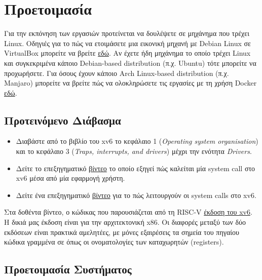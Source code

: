 \documentclass[18pt]{extarticle}
\begin{document}
\section{Προετοιμασία}

Για την εκπόνηση των εργασιών προτείνεται να δουλέψετε σε μηχάνημα που τρέχει Linux.
Οδηγιές για το πώς να ετοιμάσετε μια εικονική μηχανή με Debian Linux σε VirtualBox μπορείτε να βρείτε \href{}{εδώ}. %
Αν έχετε ήδη μηχάνημα το οποίο τρέχει Linux και συγκεκριμένα κάποιο
Debian-based distribution (π.χ. Ubuntu) τότε μπορείτε να προχωρήσετε.
Για όσους έχουν κάποιο Arch Linux-based distribution (π.χ. Manjaro) μπορείτε να βρείτε πώς να ολοκληρώσετε τις εργασίες
με τη χρήση Docker \href{}{εδώ}. %

\subsection{Προτεινόμενο Διάβασμα}

\begin{itemize}

    \item Διαβάστε από το βιβλίο του xv6 \cite{xv6Book} το κεφάλαιο 1 (\textit{Operating
          system organisation}) και το κεφάλαιο 3 (\textit{Traps, interrupts, and
          drivers}) μέχρι την ενότητα \textit{Drivers}.
    \item Δείτε το επεξηγηματικό \href{https://www.youtube.com/watch?v=RdxHGyeoyqI}{βίντεο} το οποίο εξηγεί πώς καλείται μία system call στο xv6 μέσα από μία εφαρμογή χρήστη.
    \item Δείτε ένα επεξηγηματικό \href{https://www.youtube.com/watch?v=w7Q66ItKrn8}{βίντεο} για το πώς λειτουργούν οι system calls στο xv6.

\end{itemize}

\begin{info}[Σημείωση]
    Στα δοθέντα βίντεο, ο κώδικας που παρουσιάζεται από τη RISC-V \href{https://github.com/mit-pdos/xv6-riscv}{έκδοση του xv6}.
    Η δικιά μας έκδοση είναι για την αρχιτεκτονική x86. Οι διαφορές μεταξύ των δύο εκδόσεων είναι πρακτικά αμελητέες,
    με μόνες εξαιρέσεις τα σημεία του πηγαίου κώδικα γραμμένα σε  όπως οι ονοματολογίες των καταχωρητών (registers).
\end{info}

\subsection{Προετοιμασία Συστήματος}
\end{document}
